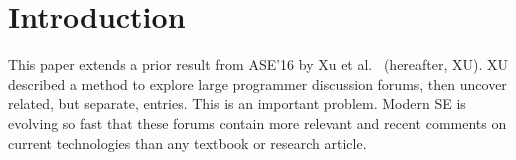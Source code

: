 \documentclass[sigconf,review, anonymous]{acmart}
\theoremstyle{break}
\begin{document}
%
%





\maketitle

% 


\section{Introduction}


This paper extends a prior result from ASE'16 by
 Xu et al.~\cite{xu2016predicting} (hereafter, XU). XU described
 a method to
 explore large programmer discussion forums, then 
 uncover related, but separate, entries.
 This is an important problem. Modern SE
 is evolving so fast that these  forums
 contain more relevant and recent comments on 
 current technologies than any textbook or research article.
 
\end{document}
